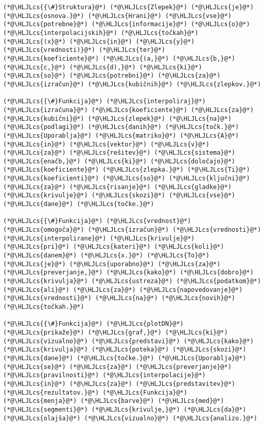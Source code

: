 \documentclass[12pt,a4paper]{article}
\newcommand{\HLJLcs}[1]{\textcolor[RGB]{153,153,119}{\textit{#1}}}
\begin{document}
\begin{lstlisting}
(*@\HLJLcs{{\#}Struktura}@*) (*@\HLJLcs{Zlepek}@*) (*@\HLJLcs{je}@*) (*@\HLJLcs{osnova.}@*) (*@\HLJLcs{Hrani}@*) (*@\HLJLcs{vse}@*) (*@\HLJLcs{potrebne}@*) (*@\HLJLcs{informacije}@*) (*@\HLJLcs{o}@*) (*@\HLJLcs{interpolacijskih}@*) (*@\HLJLcs{točkah}@*) (*@\HLJLcs{(x}@*) (*@\HLJLcs{in}@*) (*@\HLJLcs{y}@*) (*@\HLJLcs{vrednosti)}@*) (*@\HLJLcs{ter}@*) (*@\HLJLcs{koeficiente}@*) (*@\HLJLcs{(a,}@*) (*@\HLJLcs{b,}@*) (*@\HLJLcs{c,}@*) (*@\HLJLcs{d),}@*) (*@\HLJLcs{ki}@*) (*@\HLJLcs{so}@*) (*@\HLJLcs{potrebni}@*) (*@\HLJLcs{za}@*) (*@\HLJLcs{izračun}@*) (*@\HLJLcs{kubičnih}@*) (*@\HLJLcs{zlepkov.}@*)

(*@\HLJLcs{{\#}Funkcija}@*) (*@\HLJLcs{interpoliraj}@*) (*@\HLJLcs{izračuna}@*) (*@\HLJLcs{koeficiente}@*) (*@\HLJLcs{za}@*) (*@\HLJLcs{kubični}@*) (*@\HLJLcs{zlepek}@*) (*@\HLJLcs{na}@*) (*@\HLJLcs{podlagi}@*) (*@\HLJLcs{danih}@*) (*@\HLJLcs{točk.}@*) (*@\HLJLcs{Uporablja}@*) (*@\HLJLcs{matriko}@*) (*@\HLJLcs{A}@*) (*@\HLJLcs{in}@*) (*@\HLJLcs{vektor}@*) (*@\HLJLcs{v}@*) (*@\HLJLcs{za}@*) (*@\HLJLcs{rešitev}@*) (*@\HLJLcs{sistema}@*) (*@\HLJLcs{enačb,}@*) (*@\HLJLcs{ki}@*) (*@\HLJLcs{določajo}@*) (*@\HLJLcs{koeficiente}@*) (*@\HLJLcs{zlepka.}@*) (*@\HLJLcs{Ti}@*) (*@\HLJLcs{koeficienti}@*) (*@\HLJLcs{so}@*) (*@\HLJLcs{ključni}@*) (*@\HLJLcs{za}@*) (*@\HLJLcs{risanje}@*) (*@\HLJLcs{gladke}@*) (*@\HLJLcs{krivulje}@*) (*@\HLJLcs{skozi}@*) (*@\HLJLcs{vse}@*) (*@\HLJLcs{dane}@*) (*@\HLJLcs{točke.}@*)

(*@\HLJLcs{{\#}Funkcija}@*) (*@\HLJLcs{vrednost}@*) (*@\HLJLcs{omogoča}@*) (*@\HLJLcs{izračun}@*) (*@\HLJLcs{vrednosti}@*) (*@\HLJLcs{interpolirane}@*) (*@\HLJLcs{krivulje}@*) (*@\HLJLcs{pri}@*) (*@\HLJLcs{kateri}@*) (*@\HLJLcs{koli}@*) (*@\HLJLcs{danem}@*) (*@\HLJLcs{x.}@*) (*@\HLJLcs{To}@*) (*@\HLJLcs{je}@*) (*@\HLJLcs{uporabno}@*) (*@\HLJLcs{za}@*) (*@\HLJLcs{preverjanje,}@*) (*@\HLJLcs{kako}@*) (*@\HLJLcs{dobro}@*) (*@\HLJLcs{krivulja}@*) (*@\HLJLcs{ustreza}@*) (*@\HLJLcs{podatkom}@*) (*@\HLJLcs{ali}@*) (*@\HLJLcs{za}@*) (*@\HLJLcs{napovedovanje}@*) (*@\HLJLcs{vrednosti}@*) (*@\HLJLcs{na}@*) (*@\HLJLcs{novih}@*) (*@\HLJLcs{točkah.}@*)

(*@\HLJLcs{{\#}Funkcija}@*) (*@\HLJLcs{plotDN}@*) (*@\HLJLcs{prikaže}@*) (*@\HLJLcs{graf,}@*) (*@\HLJLcs{ki}@*) (*@\HLJLcs{vizualno}@*) (*@\HLJLcs{predstavi}@*) (*@\HLJLcs{kako}@*) (*@\HLJLcs{krivulja}@*) (*@\HLJLcs{poteka}@*) (*@\HLJLcs{skozi}@*) (*@\HLJLcs{dane}@*) (*@\HLJLcs{točke.}@*) (*@\HLJLcs{Uporablja}@*) (*@\HLJLcs{se}@*) (*@\HLJLcs{za}@*) (*@\HLJLcs{preverjanje}@*) (*@\HLJLcs{pravilnosti}@*) (*@\HLJLcs{interpolacije}@*) (*@\HLJLcs{in}@*) (*@\HLJLcs{za}@*) (*@\HLJLcs{predstavitev}@*) (*@\HLJLcs{rezultatov.}@*) (*@\HLJLcs{Funkcija}@*) (*@\HLJLcs{menja}@*) (*@\HLJLcs{barve}@*) (*@\HLJLcs{med}@*) (*@\HLJLcs{segmenti}@*) (*@\HLJLcs{krivulje,}@*) (*@\HLJLcs{da}@*) (*@\HLJLcs{olajša}@*) (*@\HLJLcs{vizualno}@*) (*@\HLJLcs{analizo.}@*)


\end{lstlisting}
\end{document}
